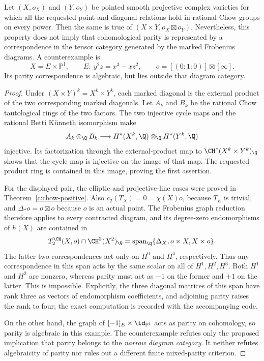 \begin{proposition}
\label{c:product-parity}
Let $(X,o_X)$ and $(Y,o_Y)$ be pointed smooth projective complex
varieties for which all the requested point-and-diagonal relations
hold in rational Chow groups on every power.  Then the same is
true of $(X\times Y,o_X\boxtimes o_Y)$.
Nevertheless, this property does not imply that cohomological
parity is represented by a correspondence in the tensor category
generated by the marked Frobenius diagrams.  A counterexample is
\[
 X=E\times\mathbb P^1,\qquad
 E:\ y^2z=x^3-xz^2,\qquad
 o=[(0:1:0)]\boxtimes[\infty].
\]
Its parity correspondence is algebraic, but lies outside that
diagram category.
\end{proposition}

\begin{proof}
Under $(X\times Y)^k=X^k\times Y^k$, each marked diagonal is
the external product of the two corresponding marked diagonals.
Let $A_k$ and $B_k$ be the rational Chow tautological rings of the
two factors.  The two injective cycle maps and the rational Betti
K\"unneth isomorphism make
\[
 A_k\otimes_\Q B_k\longrightarrow
 H^*(X^k,\Q)\otimes_\Q H^*(Y^k,\Q)
\]
injective.  Its factorization through the external-product map
to $\CH^*(X^k\times Y^k)_\Q$ shows that the cycle map is
injective on the image of that map.  The requested product ring
is contained in this image, proving the first assertion.

For the displayed pair, the elliptic and projective-line cases
were proved in Theorem~\ref{c:chow-positive}.
Also $c_2(T_X)=0=\chi(X)o$, because $T_E$ is trivial, and
$\Delta_*o=o\boxtimes o$ because $o$ is an actual point.
The Frobenius graph reduction therefore applies to every
contracted diagram, and its degree-zero endomorphisms of $h(X)$
are contained in
\[
 T^{\CH}_2(X,o)\cap\CH^2(X^2)_\Q
   =\operatorname{span}_\Q\{\Delta_X,o\times X,X\times o\}.
\]
The latter two correspondences act only on $H^0$ and $H^4$,
respectively.  Thus any correspondence in this span acts by the
same scalar on all of $H^1,H^2,H^3$.  Both $H^1$ and $H^2$ are
nonzero, whereas parity must act as $-1$ on the former and $+1$
on the latter.  This is impossible.  Explicitly, the three diagonal
matrices of this span have rank three as vectors of endomorphism
coefficients, and adjoining parity raises the rank to four; the
exact computation is recorded with the accompanying code.

On the other hand, the graph of
$[-1]_E\times\id_{\mathbb P^1}$ acts as parity on cohomology,
so parity is algebraic in this example.  The counterexample
refutes only the proposed implication that parity belongs to the
\emph{narrow diagram category}.  It neither refutes algebraicity
of parity nor rules out a different finite mixed-parity criterion.
\end{proof}

